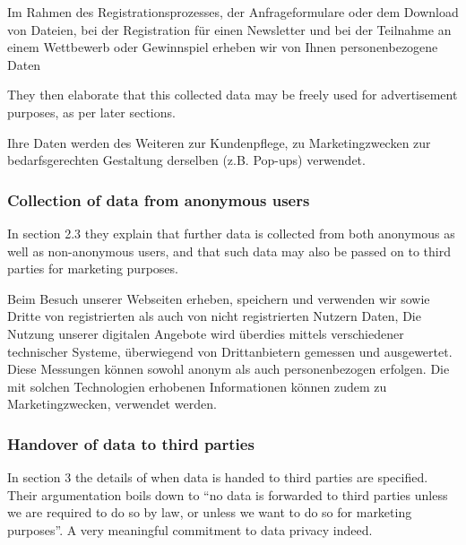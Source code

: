 \documentclass[a4paper]{scrreprt}
\begin{document}
\begin{displayquote}
		Im Rahmen des Registrationsprozesses, der Anfrageformulare oder dem
		Download von Dateien, bei der Registration für einen Newsletter und bei
		der Teilnahme an einem Wettbewerb oder Gewinnspiel erheben wir von
		Ihnen personenbezogene Daten \textelp{}
\end{displayquote}

They then elaborate that this collected data may be freely used for
advertisement purposes, as per later sections.

\begin{displayquote}
		Ihre Daten werden des Weiteren zur Kundenpflege, zu Marketingzwecken
		zur bedarfsgerechten Gestaltung derselben (z.B. Pop-ups) verwendet.
\end{displayquote}

\subsubsection{Collection of data from anonymous users}

In section 2.3 they explain that further data is collected from both anonymous
as well as non-anonymous users, and that such data may also be passed on to
third parties for marketing purposes.

\begin{displayquote}
		Beim Besuch unserer Webseiten erheben, speichern und verwenden wir
		sowie Dritte von registrierten als auch von nicht registrierten Nutzern
		Daten, \textelp{}
		Die Nutzung unserer digitalen Angebote wird überdies mittels
		verschiedener technischer Systeme, überwiegend von Drittanbietern
		gemessen und ausgewertet. Diese Messungen können sowohl anonym als auch
		personenbezogen erfolgen. \textelp{} Die mit solchen Technologien erhobenen
		Informationen können zudem zu Marketingzwecken, \textelp{} verwendet werden.
\end{displayquote}

\subsubsection{Handover of data to third parties}

In section 3 the details of when data is handed to third parties are specified.
Their argumentation boils down to ``no data is forwarded to third parties unless
we are required to do so by law, or unless we want to do so for marketing
purposes''. A very meaningful commitment to data privacy indeed.
\end{document}
